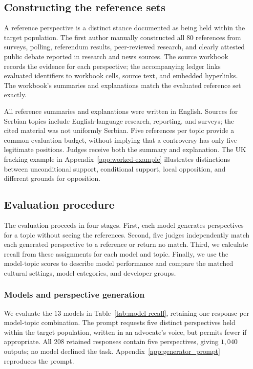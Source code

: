 \documentclass[11pt,a4paper]{article}
\begin{document}
\subsection{Constructing the reference sets}
\label{sec:referencesets}
A reference perspective is a distinct stance documented as being held within the target population. The first author manually constructed all $80$ references from surveys, polling, referendum results, peer-reviewed research, and clearly attested public debate reported in research and news sources. The source workbook records the evidence for each perspective; the accompanying ledger links evaluated identifiers to workbook cells, source text, and embedded hyperlinks. The workbook's summaries and explanations match the evaluated reference set exactly.

All reference summaries and explanations were written in English. Sources for Serbian topics include English-language research, reporting, and surveys; the cited material was not uniformly Serbian. Five references per topic provide a common evaluation budget, without implying that a controversy has only five legitimate positions. Judges receive both the summary and explanation. The UK fracking example in Appendix~\ref{app:worked-example} illustrates distinctions between unconditional support, conditional support, local opposition, and different grounds for opposition.

\subsection{Evaluation procedure}
\label{sec:evaluation}
The evaluation proceeds in four stages. First, each model generates perspectives for a topic without seeing the references. Second, five judges independently match each generated perspective to a reference or return no match. Third, we calculate recall from these assignments for each model and topic. Finally, we use the model-topic scores to describe model performance and compare the matched cultural settings, model categories, and developer groups.

\subsubsection{Models and perspective generation}
\label{sec:perspective-generation}
We evaluate the $13$ models in Table~\ref{tab:model-recall}, retaining one response per model-topic combination. The prompt requests five distinct perspectives held within the target population, written in an advocate's voice, but permits fewer if appropriate. All $208$ retained responses contain five perspectives, giving $1{,}040$ outputs; no model declined the task. Appendix~\ref{app:generator_prompt} reproduces the prompt.
\end{document}
